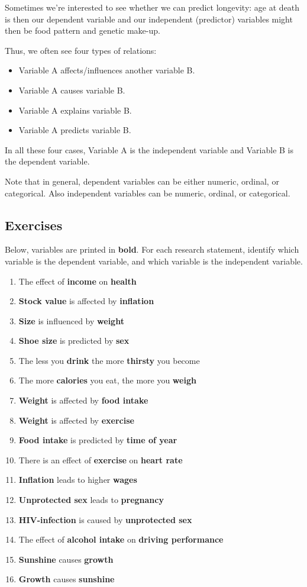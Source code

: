 \documentclass[]{book}\usepackage[]{graphicx}\usepackage[]{color}
\begin{document}
Sometimes we're interested to see whether we can predict longevity: age at death is then our dependent variable and our independent (predictor) variables might then be food pattern and genetic make-up. 

Thus, we often see four types of relations:
\begin{itemize}
\item Variable A affects/influences another variable B.
\item Variable A causes variable B.
\item Variable A explains variable B.
\item Variable A predicts variable B.
\end{itemize}

In all these four cases, Variable A is the independent variable and Variable B is the dependent variable.

Note that in general, dependent variables can be either numeric, ordinal, or categorical. Also independent variables can be numeric, ordinal, or categorical. 

\subsection{Exercises}

Below, variables are printed in \textbf{bold}. For each research statement, identify which variable is the dependent variable, and which variable is the independent variable.

\begin{enumerate}

\item The effect of \textbf{income} on \textbf{health}
\item \textbf{Stock value} is affected by \textbf{inflation}
\item \textbf{Size} is influenced by \textbf{weight}
\item \textbf{Shoe size} is predicted by \textbf{sex}
\item The less you \textbf{drink} the more \textbf{thirsty} you become 
\item The more \textbf{calories} you eat, the more you \textbf{weigh}
\item \textbf{Weight} is affected by \textbf{food intake} 
\item \textbf{Weight} is affected by \textbf{exercise} 
\item \textbf{Food intake} is predicted by \textbf{time of year}
\item There is an effect of \textbf{exercise} on \textbf{heart rate} 
\item \textbf{Inflation} leads to higher \textbf{wages} 
\item \textbf{Unprotected sex} leads to \textbf{pregnancy}
\item \textbf{HIV-infection} is caused by \textbf{unprotected sex}
\item The effect of \textbf{alcohol intake} on \textbf{driving performance}
\item \textbf{Sunshine} causes \textbf{growth}
\item \textbf{Growth} causes \textbf{sunshine}

\end{enumerate}
\end{document}
